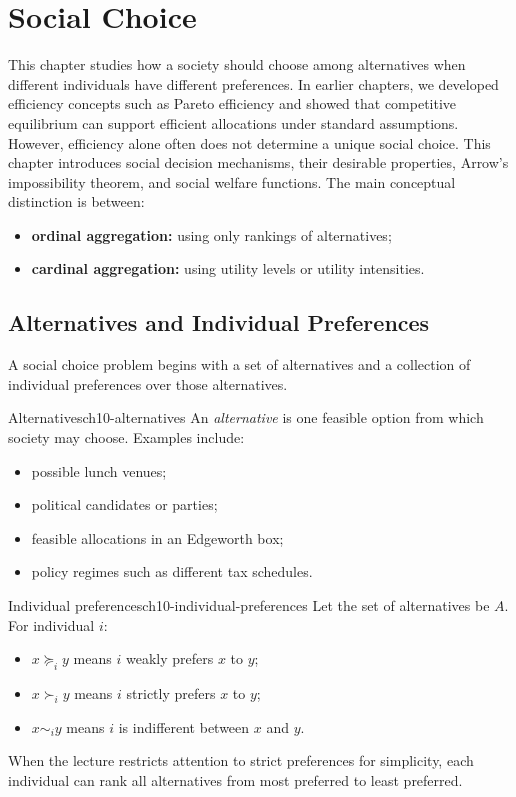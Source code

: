 
\section{Social Choice}

This chapter studies how a society should choose among alternatives when different individuals have different preferences. In earlier chapters, we developed efficiency concepts such as Pareto efficiency and showed that competitive equilibrium can support efficient allocations under standard assumptions. However, efficiency alone often does not determine a unique social choice. This chapter introduces social decision mechanisms, their desirable properties, Arrow's impossibility theorem, and social welfare functions. The main conceptual distinction is between:
\begin{itemize}
    \item \textbf{ordinal aggregation:} using only rankings of alternatives;
    \item \textbf{cardinal aggregation:} using utility levels or utility intensities.
\end{itemize}

\subsection{Alternatives and Individual Preferences}

A social choice problem begins with a set of alternatives and a collection of individual preferences over those alternatives.

\begin{definition}{Alternatives}{ch10-alternatives}
An \emph{alternative} is one feasible option from which society may choose. Examples include:
\begin{itemize}
    \item possible lunch venues;
    \item political candidates or parties;
    \item feasible allocations in an Edgeworth box;
    \item policy regimes such as different tax schedules.
\end{itemize}
\end{definition}

\begin{definition}{Individual preferences}{ch10-individual-preferences}
Let the set of alternatives be $A$. For individual $i$:
\begin{itemize}
    \item $x \succeq_i y$ means $i$ weakly prefers $x$ to $y$;
    \item $x \succ_i y$ means $i$ strictly prefers $x$ to $y$;
    \item $x \sim_i y$ means $i$ is indifferent between $x$ and $y$.
\end{itemize}
When the lecture restricts attention to strict preferences for simplicity, each individual can rank all alternatives from most preferred to least preferred.
\end{definition}

